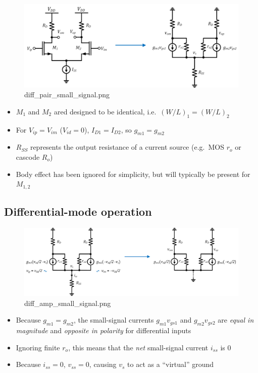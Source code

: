 \documentclass[11pt]{article}
\providecommand{\tightlist}{%
      \setlength{\itemsep}{0pt}\setlength{\parskip}{0pt}}
\begin{document}
    \begin{figure}
\centering
\includegraphics{diff_pair_small_signal.png}
\caption{diff\_pair\_small\_signal.png}
\end{figure}

    \begin{itemize}
\tightlist
\item
  \(M_1\) and \(M_2\) ared designed to be identical,
  i.e.~\((W/L)_1 = (W/L)_2\)
\item
  For \(V_{ip} = V_{im}\) (\(V_{id} = 0\)), \(I_{D1} = I_{D2}\), so
  \(g_{m1} = g_{m2}\)
\item
  \(R_{SS}\) represents the output resistance of a current source
  (e.g.~MOS \(r_o\) or cascode \(R_o\))
\item
  Body effect has been ignored for simplicity, but will typically be
  present for \(M_{1,2}\)
\end{itemize}

    \hypertarget{differential-mode-operation}{%
\subsection{Differential-mode
operation}\label{differential-mode-operation}}

    \begin{figure}
\centering
\includegraphics{diff_amp_small_signal.png}
\caption{diff\_amp\_small\_signal.png}
\end{figure}

    \begin{itemize}
\tightlist
\item
  Because \(g_{m1} = g_{m2}\), the small-signal currents
  \(g_{m1}v_{gs1}\) and \(g_{m2}v_{gs2}\) are \emph{equal in magnitude}
  and \emph{opposite in polarity} for differential inputs
\item
  Ignoring finite \(r_o\), this means that the \emph{net} small-signal
  current \(i_{ss}\) is \(0\)
\item
  Because \(i_{ss} = 0\), \(v_{ss} = 0\), causing \(v_s\) to act as a
  ``virtual'' ground
\end{itemize}
\end{document}
